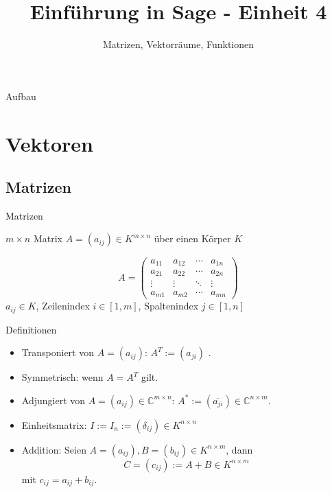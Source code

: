 \documentclass[notes=hide,hyperref={dvipdfmx,pdfpagelabels=false}]{beamer}
\title{Einführung in Sage - Einheit 4}
\subtitle{Matrizen, Vektorräume, Funktionen}
\begin{document}
\maketitle

\begin{frame}{Aufbau}
\tableofcontents
\end{frame}


\section{Vektoren}
\subsection{Matrizen}

\begin{frame}{Matrizen}

{\color{red} $m \times n$ Matrix} $A=(a_{ij}) \in K^{m\times n}$ über einen Körper $K$ 

\[ A = \left( \begin{array}{cccc}
a_{11} & a_{12} & \cdots & a_{1n} \\
a_{21} & a_{22} & \cdots & a_{2n} \\
\vdots & \vdots & \ddots & \vdots \\
a_{m1} & a_{m2} & \cdots & a_{mn} 
\end{array} \right) \] 
$a_{ij} \in K$, Zeilenindex $i \in [1,m]$, Spaltenindex $j \in [1,n]$

\end{frame}

\begin{frame}{Definitionen}
\begin{itemize}
\item {\color{red} Transponiert} von $A=(a_{ij})$: $A^T:=(a_{ji})$ .
\item {\color{red} Symmetrisch}: wenn $A=A^T$ gilt.
\item \alert{Adjungiert} von $A=(a_{ij})\in \mathbb{C}^{m\times n}$: $A^* :=
(\overline{a_{ji}}) \in \mathbb{C}^{n \times m}$.
\item \alert{Einheitsmatrix}: $I:=I_n:=(\delta_{ij}) \in K^{n \times
n}$
\item {\color{red} Addition}: Seien $A=(a_{ij}),B=(b_{ij}) \in {K}^{n \times m}$, dann
\[ C=(c_{ij}):=A+B \in {K}^{n \times m} \]
mit $c_{ij}=a_{ij}+b_{ij}$.  
\end{itemize}
\end{frame} 
\end{document}
